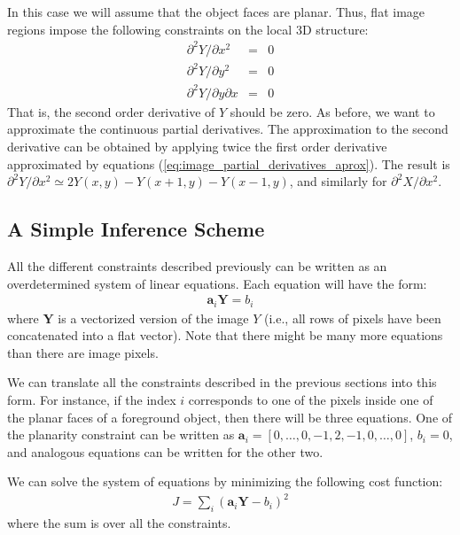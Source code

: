 In this case we will assume that the object faces are planar. Thus, flat image regions impose the following constraints on the local 3D structure:
\begin{eqnarray}
\partial^2 Y / \partial x^2 & = & 0  \\
\partial^2 Y / \partial y^2 & = & 0 \\  
\partial^2 Y / \partial y \partial x & = & 0 
\end{eqnarray}
That is, the second order derivative of $Y$ should be zero. As before, we want to approximate the continuous partial derivatives. The approximation to the  second derivative can be obtained by applying twice the first order derivative approximated by equations (\ref{eq:image_partial_derivatives_aprox}). The result is
$\partial^2 Y / \partial x^2 \simeq 2Y(x,y)-Y(x+1,y)-Y(x-1,y)$, and similarly for $\partial^2 X / \partial x^2$.


\subsection{A Simple Inference Scheme}

All the different constraints described previously can be written as an overdetermined system of linear equations. Each equation will have the form:
\begin{eqnarray}
\mathbf{a}_i \mathbf{Y} = b_i
\end{eqnarray}
where $\mathbf{Y}$ is a vectorized version of the image $Y$ (i.e., all rows of pixels have been concatenated into a flat vector). Note that there might be many more equations than there are image pixels.

We can translate all the constraints described in the previous sections into this form. For instance, if the index $i$ corresponds to one of the pixels inside one of the planar faces of a foreground object, then there will be three equations. One of the planarity constraint can be written as $\mathbf{a}_i = [0, \dots, 0, -1, 2, -1, 0, \dots, 0]$, $b_i=0$, and analogous equations can be written for the other two.

We can solve the system of equations by minimizing the following cost function:
\begin{eqnarray}
J = \sum_i (\mathbf{a}_i\mathbf{Y} - b_i)^2
\end{eqnarray}
where the sum is over all the constraints. 

